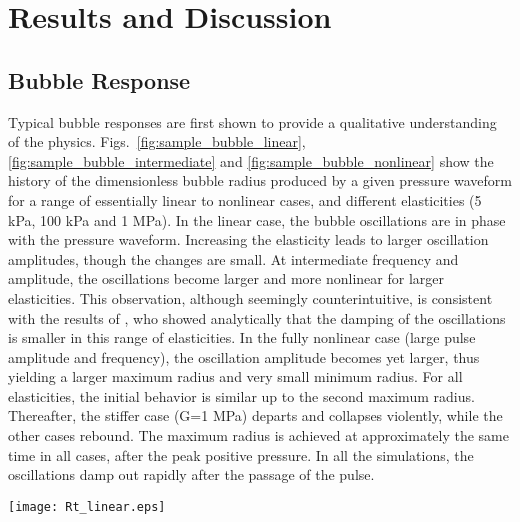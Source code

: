 \documentclass[%
preprint,%
author-year,%
]{jasatex}
\begin{document}
 


\section{Results and Discussion}
\label{sec:results}

\subsection{Bubble Response}

Typical bubble responses are first shown to provide a qualitative
understanding of the physics.  Figs.~\ref{fig:sample_bubble_linear},
\ref{fig:sample_bubble_intermediate} and
\ref{fig:sample_bubble_nonlinear} show the history of the dimensionless bubble
radius produced by a given pressure waveform for a range
of essentially linear to nonlinear cases, and different elasticities (5 kPa, 100
kPa and 1 MPa). In the linear case, the bubble oscillations are in
phase with the pressure waveform. Increasing the elasticity leads to
larger oscillation amplitudes, though the changes are small. At
intermediate frequency and amplitude, the oscillations become larger
and more nonlinear for larger elasticities. This observation, although 
seemingly counterintuitive, is
consistent with the results of \cite{johnsen2012}, who showed analytically
that the damping of the oscillations is smaller in this range of
elasticities.  In the fully nonlinear case (large pulse amplitude and
frequency), the oscillation amplitude becomes yet larger, thus
yielding a larger maximum radius and very small minimum radius.  For
all elasticities, the initial behavior is similar up to the second
maximum radius. Thereafter, the stiffer case (G=1 MPa) departs and
collapses violently, while the other cases rebound. The maximum radius
is achieved at approximately the same time in all cases, after the
peak positive pressure. In all the simulations, the oscillations
damp out rapidly after the passage of the pulse.

\begin{figure*}[!t]
  \centering \texttt{[image: Rt\_linear.eps]}
  \caption{(color online) History of the bubble radius (top) and input-pressure
    waveform (bottom) for an essentially linear case (frequency: 1.5 MHz; peak 
    negative pressure: 0.35 MPa). No bioeffects are observed
    here. $R_0=1$ $\mu$m; solid: $G=5$ kPa; dashed: $G=100$ kPa; dotted: $G=1$ MPa.}
  \label{fig:sample_bubble_linear}
\end{figure*}
\end{document}
